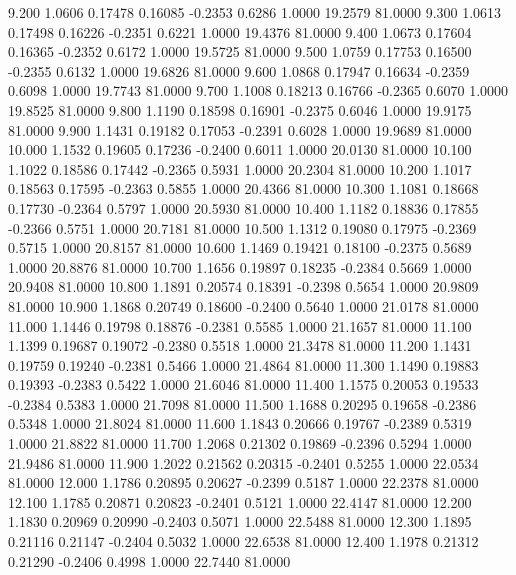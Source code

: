    9.200   1.0606   0.17478   0.16085  -0.2353   0.6286   1.0000  19.2579  81.0000
   9.300   1.0613   0.17498   0.16226  -0.2351   0.6221   1.0000  19.4376  81.0000
   9.400   1.0673   0.17604   0.16365  -0.2352   0.6172   1.0000  19.5725  81.0000
   9.500   1.0759   0.17753   0.16500  -0.2355   0.6132   1.0000  19.6826  81.0000
   9.600   1.0868   0.17947   0.16634  -0.2359   0.6098   1.0000  19.7743  81.0000
   9.700   1.1008   0.18213   0.16766  -0.2365   0.6070   1.0000  19.8525  81.0000
   9.800   1.1190   0.18598   0.16901  -0.2375   0.6046   1.0000  19.9175  81.0000
   9.900   1.1431   0.19182   0.17053  -0.2391   0.6028   1.0000  19.9689  81.0000
  10.000   1.1532   0.19605   0.17236  -0.2400   0.6011   1.0000  20.0130  81.0000
  10.100   1.1022   0.18586   0.17442  -0.2365   0.5931   1.0000  20.2304  81.0000
  10.200   1.1017   0.18563   0.17595  -0.2363   0.5855   1.0000  20.4366  81.0000
  10.300   1.1081   0.18668   0.17730  -0.2364   0.5797   1.0000  20.5930  81.0000
  10.400   1.1182   0.18836   0.17855  -0.2366   0.5751   1.0000  20.7181  81.0000
  10.500   1.1312   0.19080   0.17975  -0.2369   0.5715   1.0000  20.8157  81.0000
  10.600   1.1469   0.19421   0.18100  -0.2375   0.5689   1.0000  20.8876  81.0000
  10.700   1.1656   0.19897   0.18235  -0.2384   0.5669   1.0000  20.9408  81.0000
  10.800   1.1891   0.20574   0.18391  -0.2398   0.5654   1.0000  20.9809  81.0000
  10.900   1.1868   0.20749   0.18600  -0.2400   0.5640   1.0000  21.0178  81.0000
  11.000   1.1446   0.19798   0.18876  -0.2381   0.5585   1.0000  21.1657  81.0000
  11.100   1.1399   0.19687   0.19072  -0.2380   0.5518   1.0000  21.3478  81.0000
  11.200   1.1431   0.19759   0.19240  -0.2381   0.5466   1.0000  21.4864  81.0000
  11.300   1.1490   0.19883   0.19393  -0.2383   0.5422   1.0000  21.6046  81.0000
  11.400   1.1575   0.20053   0.19533  -0.2384   0.5383   1.0000  21.7098  81.0000
  11.500   1.1688   0.20295   0.19658  -0.2386   0.5348   1.0000  21.8024  81.0000
  11.600   1.1843   0.20666   0.19767  -0.2389   0.5319   1.0000  21.8822  81.0000
  11.700   1.2068   0.21302   0.19869  -0.2396   0.5294   1.0000  21.9486  81.0000
  11.900   1.2022   0.21562   0.20315  -0.2401   0.5255   1.0000  22.0534  81.0000
  12.000   1.1786   0.20895   0.20627  -0.2399   0.5187   1.0000  22.2378  81.0000
  12.100   1.1785   0.20871   0.20823  -0.2401   0.5121   1.0000  22.4147  81.0000
  12.200   1.1830   0.20969   0.20990  -0.2403   0.5071   1.0000  22.5488  81.0000
  12.300   1.1895   0.21116   0.21147  -0.2404   0.5032   1.0000  22.6538  81.0000
  12.400   1.1978   0.21312   0.21290  -0.2406   0.4998   1.0000  22.7440  81.0000
